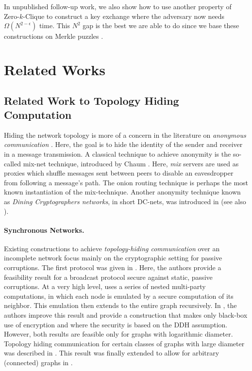 In unpublished follow-up work, we also show how to use another property of Zero-$k$-Clique to construct a key exchange where the adversary now needs $\Omega(N^{2 - \epsilon})$ time. This $N^2$ gap is the best we are able to do since we base these constructions on Merkle puzzles \cite{optimalMerklePuzzles}.

\section{Related Works}
\subsection{Related Work to Topology Hiding Computation}
Hiding the network topology is more of a concern in the literature on \emph{anonymous communication} \cite{ACM:Cha81,ACM:RR98,IEEE:SGR97}. Here, the goal is to hide the identity of the sender and receiver in a message transmission. A classical technique to achieve anonymity is the so-called mix-net technique, introduced by Chaum \cite{ACM:Cha81}. Here, \emph{mix} servers are used as proxies which shuffle messages sent between peers to disable an eavesdropper from following a message's path. The onion routing technique \cite{IEEE:SGR97,ACM:RR98} is perhaps the most known instantiation of the mix-technique. %
Another anonymity technique known as \emph{Dining Cryptographers networks}, in short DC-nets, was introduced in \cite{JC:Chaum88} (see also \cite{EC:BosDen89,EC:GolJue04}). 

\paragraph{Synchronous Networks.} Existing constructions to achieve \emph{topology-hiding communication} over an incomplete network focus mainly on the cryptographic setting for passive corruptions. The first protocol was given in \cite{TCC:MorOrlRic15}. Here, the authors provide a feasibility result for a broadcast protocol secure against static, passive corruptions. At a very high level, \cite{TCC:MorOrlRic15} uses a series of nested multi-party computations, in which each node is emulated by a secure computation of its neighbor. This emulation then extends to the entire graph recursively. In \cite{C:HMTZ16}, the authors improve this result and provide a construction that makes only black-box use of encryption and where the security is based on the DDH assumption. However, both results are feasible only for graphs with logarithmic diameter. 
Topology hiding communication for certain classes of graphs with large diameter was described in \cite{EC:AkaMor17}. This result was finally extended to allow for arbitrary (connected) graphs in \cite{C:AkaLaVMor17}.

